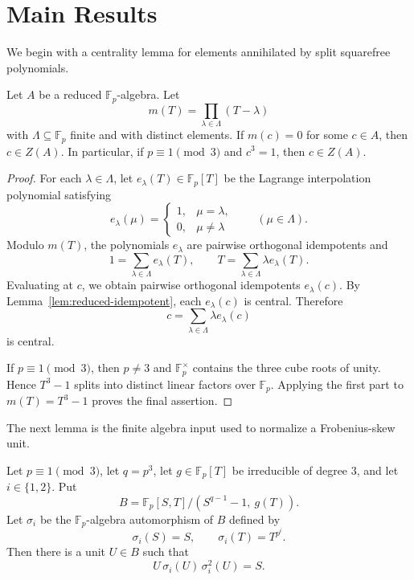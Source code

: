 \section{Main Results}\label{sec:main-results}

We begin with a centrality lemma for elements annihilated by split squarefree polynomials.

\begin{lemma}\label{lem:split-centrality}
  Let \(A\) be a reduced \(\mathbb F_p\)-algebra.  Let
  \[
    m(T)=\prod_{\lambda\in \Lambda}(T-\lambda)
  \]
  with \(\Lambda\subseteq \mathbb F_p\) finite and with distinct elements.  If \(m(c)=0\) for some \(c\in A\), then \(c\in Z(A)\).  In particular, if \(p\equiv 1 \pmod 3\) and \(c^3=1\), then \(c\in Z(A)\).
\end{lemma}

\begin{proof}
  For each \(\lambda\in\Lambda\), let \(e_\lambda(T)\in \mathbb F_p[T]\) be the Lagrange interpolation polynomial satisfying
  \[
    e_\lambda(\mu)=
    \begin{cases}
      1, & \mu=\lambda,\\
      0, & \mu\neq \lambda
    \end{cases}
    \qquad (\mu\in\Lambda).
  \]
  Modulo \(m(T)\), the polynomials \(e_\lambda\) are pairwise orthogonal idempotents and
  \[
    1=\sum_{\lambda\in\Lambda}e_\lambda(T),
    \qquad
    T=\sum_{\lambda\in\Lambda}\lambda e_\lambda(T).
  \]
  Evaluating at \(c\), we obtain pairwise orthogonal idempotents \(e_\lambda(c)\).  By Lemma~\ref{lem:reduced-idempotent}, each \(e_\lambda(c)\) is central.  Therefore
  \[
    c=\sum_{\lambda\in\Lambda}\lambda e_\lambda(c)
  \]
  is central.

  If \(p\equiv 1 \pmod 3\), then \(p\neq 3\) and \(\mathbb F_p^\times\) contains the three cube roots of unity.  Hence \(T^3-1\) splits into distinct linear factors over \(\mathbb F_p\).  Applying the first part to \(m(T)=T^3-1\) proves the final assertion.
\end{proof}

The next lemma is the finite algebra input used to normalize a Frobenius-skew unit.

\begin{lemma}\label{lem:norm-section}
  Let \(p\equiv 1 \pmod 3\), let \(q=p^3\), let \(g\in \mathbb F_p[T]\) be irreducible of degree \(3\), and let \(i\in\{1,2\}\).  Put
  \[
    B=\mathbb F_p[S,T]/(S^{q-1}-1,\ g(T)).
  \]
  Let \(\sigma_i\) be the \(\mathbb F_p\)-algebra automorphism of \(B\) defined by
  \[
    \sigma_i(S)=S,
    \qquad
    \sigma_i(T)=T^{p^i}.
  \]
  Then there is a unit \(U\in B\) such that
  \[
    U\,\sigma_i(U)\,\sigma_i^2(U)=S.
  \]
\end{lemma}

